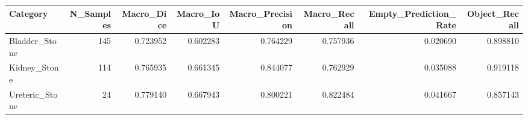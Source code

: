 \begin{tabular}{lrrrrrrr}
\toprule
Category & N_Samples & Macro_Dice & Macro_IoU & Macro_Precision & Macro_Recall & Empty_Prediction_Rate & Object_Recall \\
\midrule
Bladder_Stone & 145 & 0.723952 & 0.602283 & 0.764229 & 0.757936 & 0.020690 & 0.898810 \\
Kidney_Stone & 114 & 0.765935 & 0.661345 & 0.844077 & 0.762929 & 0.035088 & 0.919118 \\
Ureteric_Stone & 24 & 0.779140 & 0.667943 & 0.800221 & 0.822484 & 0.041667 & 0.857143 \\
\bottomrule
\end{tabular}
